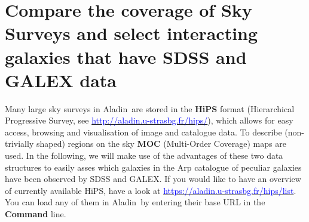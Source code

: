 \documentclass [a4paper, 12pt]{article}
\newcommand{\aladin}{{\textsc{A}{ladin}}}
\begin{document}
\section{Compare the coverage of Sky Surveys and select interacting 
galaxies that have SDSS and GALEX data}

Many large sky surveys in \aladin\ are stored in the \textbf{HiPS} format
(Hierarchical Progressive Survey, see 
\hyperref[http://aladin.u-strasbg.fr/hips/]{\textcolor{blue}
	{http://aladin.u-strasbg.fr/hips/}}),
which allows for easy access, browsing and visualisation of image and catalogue 
data. To describe (non-trivially shaped) regions on the sky \textbf{MOC} 
(Multi-Order Coverage) maps are used. In the following, we will make use of the 
advantages of these two data structures to easily asses which galaxies in the 
Arp catalogue of peculiar galaxies have been observed by SDSS and GALEX. If you 
would like to have an overview of currently available HiPS, have a look at 
\hyperref[https://aladin.u-strasbg.fr/hips/list]{\textcolor{blue}
	{https://aladin.u-strasbg.fr/hips/list}}. You can load any of them in 
\aladin\ by entering their base URL in the \textbf{Command} line.  
\end{document}
